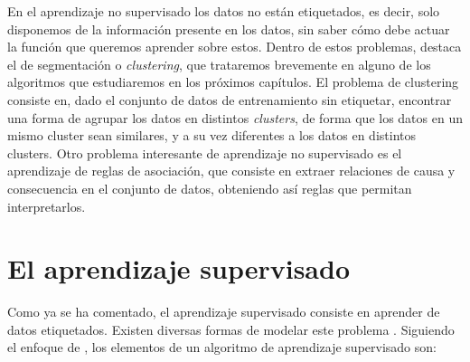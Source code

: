 En el aprendizaje no supervisado los datos no están etiquetados, es decir, solo disponemos de la información presente en los datos, sin saber cómo debe actuar la función que queremos aprender sobre estos. Dentro de estos problemas, destaca el de segmentación o \emph{clustering}, que trataremos brevemente en alguno de los algoritmos que estudiaremos en los próximos capítulos. El problema de clustering consiste en, dado el conjunto de datos de entrenamiento sin etiquetar, encontrar una forma de agrupar los datos en distintos \emph{clusters}, de forma que los datos en un mismo cluster sean similares, y a su vez diferentes a los datos en distintos clusters. Otro problema interesante de aprendizaje no supervisado es el aprendizaje de reglas de asociación, que consiste en extraer relaciones de causa y consecuencia en el conjunto de datos, obteniendo así reglas que permitan interpretarlos.

\section{El aprendizaje supervisado}

Como ya se ha comentado, el aprendizaje supervisado consiste en aprender de datos etiquetados. Existen diversas formas de modelar este problema \cite{learningfromdata,understandingml}. Siguiendo el enfoque de \cite{understandingml}, los elementos de un algoritmo de aprendizaje supervisado son:

